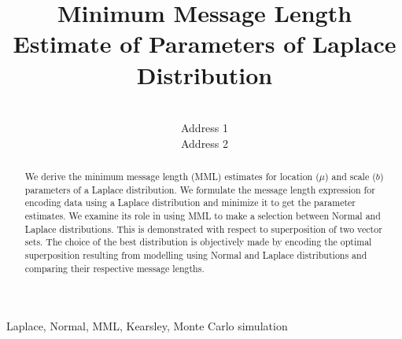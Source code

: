 \documentclass[wcp]{jmlr}
\title[MML Laplace]{Minimum Message Length Estimate of Parameters of Laplace Distribution}
\author{\Name{Author Name1} \Email{abc@sample.com}\\
  \addr Address 1
  \AND
  \Name{Author Name2} \Email{xyz@sample.com}\\
  \addr Address 2
 }
\begin{document}
\maketitle

\begin{abstract}
We derive the minimum message length (MML) estimates for location ($\mu$) and 
scale ($b$) parameters of a Laplace distribution. We formulate the message 
length expression for encoding data using a Laplace distribution and minimize it
to get the parameter estimates. We examine its role in using MML to 
make a selection between Normal and Laplace distributions. This is demonstrated 
with respect to superposition of two vector sets. The choice of the best 
distribution is objectively made by encoding the optimal superposition 
resulting from modelling using Normal and Laplace
distributions and comparing their respective message lengths.
\end{abstract}


\begin{keywords}
Laplace, Normal, MML, Kearsley, Monte Carlo simulation
\end{keywords}
\end{document}
